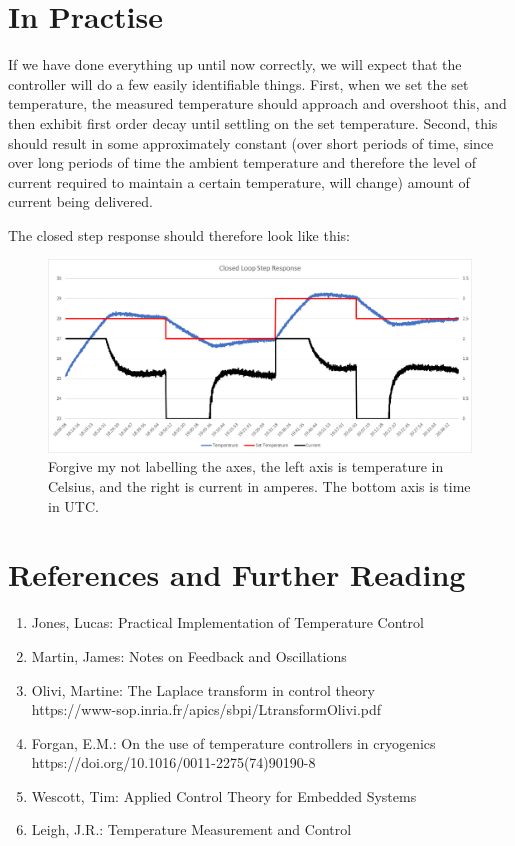 \documentclass[11pt, letterpaper]{article}
\begin{document}
\section{In Practise}
If we have done everything up until now correctly, we will expect that the controller will do a few easily identifiable things. First, when we set the set temperature, the measured temperature should approach and overshoot this, and then exhibit first order decay until settling on the set temperature. Second, this should result in some approximately constant (over short periods of time, since over long periods of time the ambient temperature and therefore the level of current required to maintain a certain temperature, will change) amount of current being delivered.

The closed step response should therefore look like this:

\begin{figure}[H]
    \centering
    \includegraphics[width=16cm]{closedLoopStep.png}
    \caption{ Forgive my not labelling the axes, the left axis is temperature in Celsius, and the right is current in amperes. The bottom axis is time in UTC. }
    \label{fig:closedLoopStep}
\end{figure}

\newpage
\section{References and Further Reading}
\begin{enumerate}
    \item Jones, Lucas: Practical Implementation of Temperature Control
    \item Martin, James: Notes on Feedback and Oscillations
    \item Olivi, Martine: The Laplace transform in control theory \\ https://www-sop.inria.fr/apics/sbpi/LtransformOlivi.pdf
    \item Forgan, E.M.: On the use of temperature controllers in cryogenics \\ https://doi.org/10.1016/0011-2275(74)90190-8
    \item Wescott, Tim: Applied Control Theory for Embedded Systems
    \item Leigh, J.R.: Temperature Measurement and Control
\end{enumerate}
\end{document}
